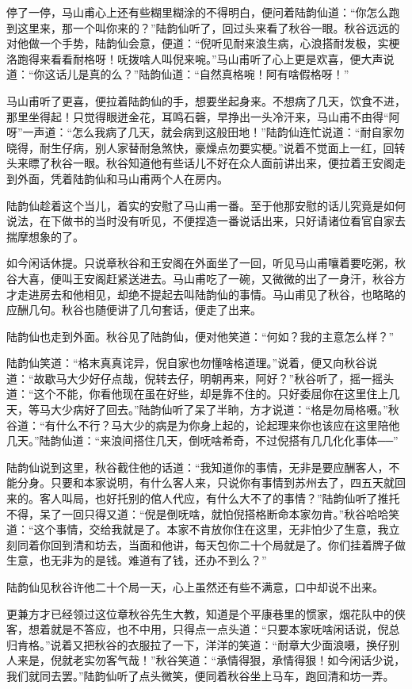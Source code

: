 \documentclass[12pt,UTF8]{ctexbook}
\begin{document}
{{{停了一停，马山甫心上还有些糊里糊涂的不得明白，便问着陆韵仙道：“你怎么跑到这里来，那一个叫你来的？”陆韵仙听了，回过头来看了秋谷一眼。秋谷远远的对他做一个手势，陆韵仙会意，便道：“倪听见耐来浪生病，心浪搭耐发极，实梗洛跑得来看看耐格呀！呒拨啥人叫倪来啘。”马山甫听了心上更是欢喜，便大声说道：“你这话儿是真的么？”陆韵仙道：“自然真格啘！阿有啥假格呀！”

马山甫听了更喜，便拉着陆韵仙的手，想要坐起身来。不想病了几天，饮食不进，那里坐得起！只觉得眼迸金花，耳鸣石磬，早挣出一头冷汗来，马山甫不由得“阿呀”一声道：“怎么我病了几天，就会病到这般田地！”陆韵仙连忙说道：“耐自家勿晓得，耐生仔病，别人家替耐急煞快，豪燥点勿要实梗。”说着不觉面上一红，回转头来瞟了秋谷一眼。秋谷知道他有些话儿不好在众人面前讲出来，便拉着王安阁走到外面，凭着陆韵仙和马山甫两个人在房内。

陆韵仙趁着这个当儿，着实的安慰了马山甫一番。至于他那安慰的话儿究竟是如何说法，在下做书的当时没有听见，不便捏造一番说话出来，只好请诸位看官自家去揣摩想象的了。

如今闲话休提。只说章秋谷和王安阁在外面坐了一回，听见马山甫嚷着要吃粥，秋谷大喜，便叫王安阁赶紧送进去。马山甫吃了一碗，又微微的出了一身汗，秋谷方才走进房去和他相见，却绝不提起去叫陆韵仙的事情。马山甫见了秋谷，也略略的应酬几句。秋谷也随便讲了几句套话，便走了出来。

陆韵仙也走到外面。秋谷见了陆韵仙，便对他笑道：“何如？我的主意怎么样？”

陆韵仙笑道：“格末真真诧异，倪自家也勿懂啥格道理。”说着，便又向秋谷说道：“故歇马大少好仔点哉，倪转去仔，明朝再来，阿好？”秋谷听了，摇一摇头道：“这个不能，你看他现在虽在好些，却是靠不住的。只好委屈你在这里住上几天，等马大少病好了回去。”陆韵仙听了呆了半晌，方才说道：“格是勿局格嗫。”秋谷道：“有什么不行？马大少的病是为你身上起的，论起理来你也该应在这里陪他几天。”陆韵仙道：“来浪间搭住几天，倒呒啥希奇，不过倪搭有几几化化事体──”

陆韵仙说到这里，秋谷截住他的话道：“我知道你的事情，无非是要应酬客人，不能分身。只要和本家说明，有什么客人来，只说你有事情到苏州去了，四五天就回来的。客人叫局，也好托别的倌人代应，有什么大不了的事情？”陆韵仙听了推托不得，呆了一回只得又道：“倪是倒呒啥，就怕倪搭格断命本家勿肯。”秋谷哈哈笑道：“这个事情，交给我就是了。本家不肯放你住在这里，无非怕少了生意，我立刻同着你回到清和坊去，当面和他讲，每天包你二十个局就是了。你们挂着牌子做生意，也无非为的是钱。难道有了钱，还办不到么？”

陆韵仙见秋谷许他二十个局一天，心上虽然还有些不满意，口中却说不出来。

更兼方才已经领过这位章秋谷先生大教，知道是个平康巷里的惯家，烟花队中的侠客，想着就是不答应，也不中用，只得点一点头道：“只要本家呒啥闲话说，倪总归肯格。”说着又把秋谷的衣服拉了一下，洋洋的笑道：“耐章大少面浪嗫，换仔别人来是，倪就老实勿客气哉！”秋谷笑道：“承情得狠，承情得狠！如今闲话少说，我们就同去罢。”陆韵仙听了点头微笑，便同着秋谷坐上马车，跑回清和坊一弄。

}}}
\end{document}
